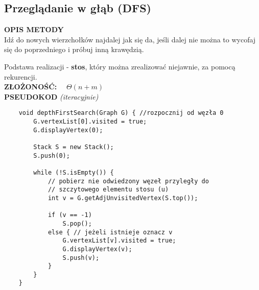 \documentclass[algorytmy.tex]{subfiles}
\begin{document}
\pagebreak

\subsection{Przeglądanie w głąb (DFS)}


    \textbf{OPIS METODY}\\

    Idź do nowych wierzchołków najdalej jak się da, jeśli dalej nie można to
    wycofaj się do poprzedniego i próbuj inną krawędzią.

    Podstawa realizacji - \textbf{stos}, który można zrealizować niejawnie,
    za pomocą rekurencji.\\

    \textbf{ZŁOŻONOŚĆ:} ~~$\Theta(n + m)$ \\

    \textbf{PSEUDOKOD} \textit{(iteracyjnie)}
    \begin{verbatim}
    void depthFirstSearch(Graph G) { //rozpocznij od węzła 0
        G.vertexList[0].visited = true;
        G.displayVertex(0);

        Stack S = new Stack();
        S.push(0);

        while (!S.isEmpty()) {
            // pobierz nie odwiedzony węzeł przyległy do
            // szczytowego elementu stosu (u)
            int v = G.getAdjUnvisitedVertex(S.top());

            if (v == -1)
                S.pop();
            else { // jeżeli istnieje oznacz v
                G.vertexList[v].visited = true;
                G.displayVertex(v);
                S.push(v);
            }
        }
    }
    \end{verbatim}
\end{document}
